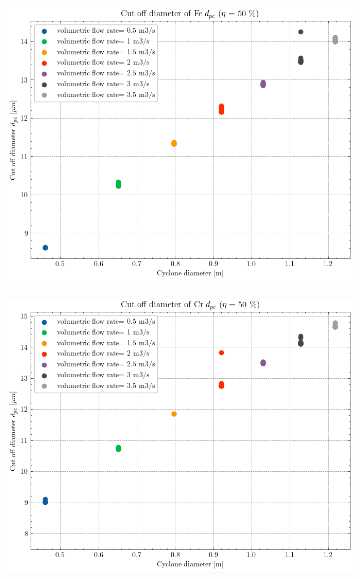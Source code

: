 \begin{figure}[H]
	\centering
	\begin{subfigure}{.49\textwidth}
		\centering
		\includegraphics[width=1.0\linewidth]{images/d_pc_Fe.png}
		\caption{}
		\label{Fe_d_cut_off}
	\end{subfigure}
	\begin{subfigure}{.49\textwidth}
		\centering
		\includegraphics[width=1.0\linewidth]{images/d_pc_Cr.png}
		\caption{}
		\label{Cr_d_cut_off}
	\end{subfigure}
	\begin{subfigure}{.49\textwidth}
		\centering

\end{subfigure}
\end{figure}
